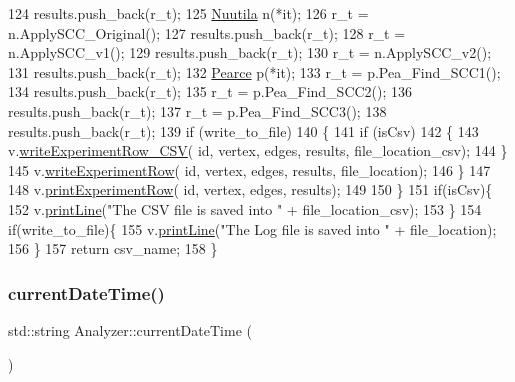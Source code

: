 \begin{DoxyCode}
124         results.push\_back(r\_t);
125         \hyperlink{class_nuutila}{Nuutila} n(*it);
126         r\_t = n.ApplySCC\_Original();
127         results.push\_back(r\_t);
128         r\_t = n.ApplySCC\_v1();
129         results.push\_back(r\_t);
130         r\_t = n.ApplySCC\_v2();
131         results.push\_back(r\_t);
132         \hyperlink{class_pearce}{Pearce} p(*it);
133         r\_t = p.Pea\_Find\_SCC1();
134         results.push\_back(r\_t);
135         r\_t = p.Pea\_Find\_SCC2();
136         results.push\_back(r\_t);
137         r\_t = p.Pea\_Find\_SCC3();
138         results.push\_back(r\_t);
139         \textcolor{keywordflow}{if} (write\_to\_file)
140         \{
141             \textcolor{keywordflow}{if} (isCsv)
142             \{
143                 v.\hyperlink{class_visualize_a8677a063c82af1b37b94c7d3a3ca3746}{writeExperimentRow\_CSV}( \textcolor{keywordtype}{id}, vertex, edges, results, 
      file\_location\_csv);
144             \}
145             v.\hyperlink{class_visualize_a8aefacec622221533485db6701d1119e}{writeExperimentRow}( \textcolor{keywordtype}{id}, vertex, edges, results, file\_location);
146         \}
147         
148         v.\hyperlink{class_visualize_a52a0dfaf625bd3ac294a00e3161094cf}{printExperimentRow}( \textcolor{keywordtype}{id}, vertex, edges, results);
149         
150     \}
151     \textcolor{keywordflow}{if}(isCsv)\{
152         v.\hyperlink{class_visualize_abce6cd538dc0715b21851e0bf0377d85}{printLine}(\textcolor{stringliteral}{"The CSV file is saved into "} + file\_location\_csv);
153     \}
154     \textcolor{keywordflow}{if}(write\_to\_file)\{
155         v.\hyperlink{class_visualize_abce6cd538dc0715b21851e0bf0377d85}{printLine}(\textcolor{stringliteral}{"The Log file is saved into "} + file\_location);
156     \}
157     \textcolor{keywordflow}{return} csv\_name;
158 \}
\end{DoxyCode}
\mbox{\label{class_analyzer_a9108681fee1078aed1af2ddee58cc55c}} 
\subsubsection{\texorpdfstring{current\+Date\+Time()}{currentDateTime()}}
{\footnotesize\ttfamily std\+::string Analyzer\+::current\+Date\+Time (\begin{DoxyParamCaption}{ }\end{DoxyParamCaption})}




